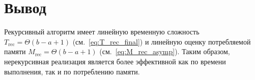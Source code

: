 \section{Вывод}

Рекурсивный алгоритм имеет линейную временную сложность $T_{\text{rec}} = \Theta(b - a + 1)$ (см.~\ref{eq:T_rec_final}) и линейную оценку потребляемой памяти $M_{\text{rec}} = \Theta(b - a + 1)$ (см.~\ref{eq:M_rec_asymp}).
Таким образом, нерекурсивная реализация является более эффективной как по времени выполнения, так и по потреблению памяти.